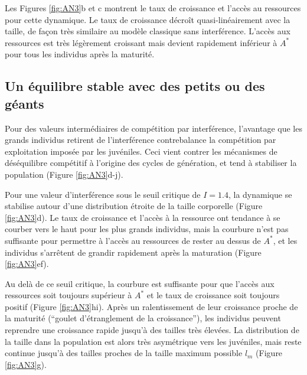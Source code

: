Les Figures \ref{fig:AN3}b et c montrent le taux de croissance et l'accès au
ressources pour cette dynamique. Le taux de croissance décroît
quasi-linéairement avec la taille, de façon très similaire au modèle classique
sans interférence. L'accès aux ressources est très légèrement croissant mais
devient rapidement inférieur à $A^*$ pour tous les individus après la maturité. 

\subsection{Un équilibre stable avec des petits ou des géants}

Pour des valeurs intermédiaires de compétition par interférence, l'avantage
que les grands individus retirent de l'interférence contrebalance la compétition
par exploitation imposée par les juvéniles. Ceci vient contrer les mécanismes
de déséquilibre compétitif à l'origine des cycles de génération, et tend à
stabiliser la population (Figure \ref{fig:AN3}d-j).

Pour une valeur d'interférence sous le seuil critique de $I=1.4$, la dynamique
se stabilise autour d'une distribution étroite de la taille corporelle (Figure
\ref{fig:AN3}d). Le taux de croissance et l'accès à la ressource ont tendance à
se courber vers le haut pour les plus grands individus, mais la courbure n'est
pas suffisante pour permettre à l'accès au ressources de rester au dessus de
$A^*$, et les individus s'arrêtent de grandir rapidement après la maturation (Figure
\ref{fig:AN3}ef).

Au delà de ce seuil critique, la courbure est suffisante pour que l'accès aux
ressources soit toujours supérieur à $A^*$ et le taux de croissance soit
toujours positif (Figure \ref{fig:AN3}hi). Après un ralentissement de leur
croissance proche de la maturité (``goulet d'étranglement de la croissance''), les individus peuvent
reprendre une croissance rapide jusqu'à des tailles très élevées. La
distribution de la taille dans la population est alors très asymétrique vers les
juvéniles, mais reste continue jusqu'à des tailles proches de la taille maximum
possible $l_m$ (Figure \ref{fig:AN3}g).
